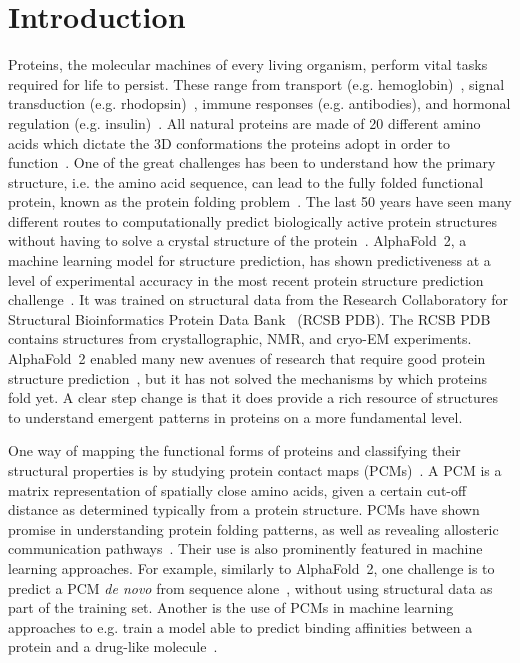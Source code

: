 \documentclass[10pt]{iopart}
\begin{document}
\section{Introduction}
Proteins, the molecular machines of every living organism, perform vital tasks required for life to persist. These range from transport (e.g. hemoglobin)~\cite{ahmed2020hemoglobin}, signal transduction (e.g. rhodopsin)~\cite{nagata2021rhodopsins}, immune responses (e.g. antibodies), and hormonal regulation (e.g. insulin)~\cite{dill2008protein, Dill1042}. All natural proteins are made of 20 different amino acids which dictate the 3D conformations the proteins adopt in order to function~\cite{scheraga2007proteinfolding}. One of the great challenges has been to understand how the primary structure, i.e. the amino acid sequence, can lead to the fully folded functional protein, known as the protein folding problem~\cite{nassar2021protein}. The last 50 years have seen many different routes to computationally predict biologically active protein structures without having to solve a crystal structure of the protein~\cite{marks2012protein}. AlphaFold~2, a machine learning model for structure prediction, has shown predictiveness at a level of experimental accuracy in the most recent protein structure prediction challenge~\cite{jumper2021highly, kryshtafovych2021critical}. It was trained on structural data from the Research Collaboratory for Structural Bioinformatics Protein Data Bank~\cite{berman2000protein} (RCSB PDB). The RCSB PDB contains structures from crystallographic, NMR, and cryo-EM experiments. AlphaFold~2 enabled many new avenues of research that require good protein structure prediction~\cite{callaway2022what}, but it has not solved the mechanisms by which proteins fold yet. A clear step change is that it does provide a rich resource of structures to understand emergent patterns in proteins on a more fundamental level. 

One way of mapping the functional forms of proteins and classifying their structural properties is by studying protein contact maps (PCMs)~\cite{Vendruscolo2002,dipaola2013protein,Estrada2011}. A PCM is a matrix representation of spatially close amino acids, given a certain cut-off distance as determined typically from a protein structure. PCMs have shown promise in understanding protein folding patterns, as well as revealing allosteric communication pathways~\cite{yao2019establishing, menichetti2016network,dokholyan2002topological}. Their use is also prominently featured in machine learning approaches. For example, similarly to AlphaFold~2, one challenge is to predict a PCM \textit{de novo} from sequence alone~\cite{bassot2019using, rives2021biological, rao2021msa}, without using structural data as part of the training set. Another is the use of PCMs in machine learning approaches to e.g. train a model able to predict binding affinities between a protein and a drug-like molecule~\cite{jiang2020drug}.
\end{document}
